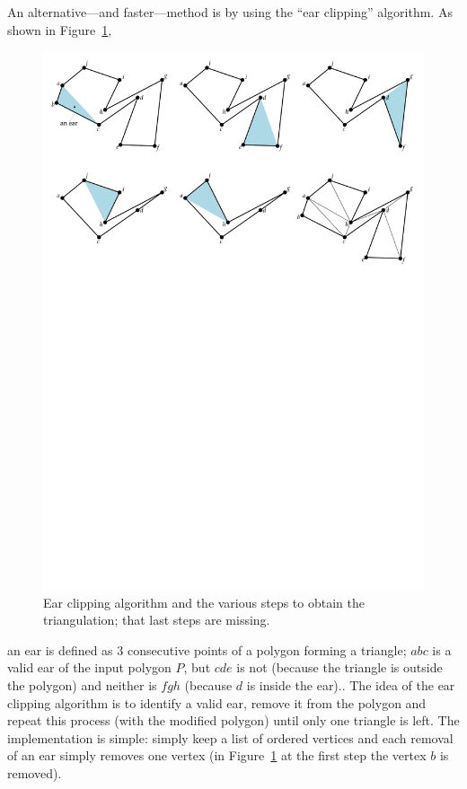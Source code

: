 An alternative---and faster---method is by using the ``ear clipping'' algorithm. 
As shown in Figure~\ref{fig:earclipping},
\begin{figure}
  \centering
  \includegraphics[width=\textwidth]{figs/earclipping}
  \caption{Ear clipping algorithm and the various steps to obtain the triangulation; that last steps are missing.}
\label{fig:earclipping}
\end{figure}
an ear is defined as 3 consecutive points of a polygon forming a triangle; $abc$ is a valid ear of the input polygon $P$, but $cde$ is not (because the triangle is outside the polygon) and neither is $fgh$ (because $d$ is inside the ear).. 
The idea of the ear clipping algorithm is to identify a valid ear, remove it from the polygon and repeat this process (with the modified polygon) until only one triangle is left. 
The implementation is simple: simply keep a list of ordered vertices and each removal of an ear simply removes one vertex (in Figure~\ref{fig:earclipping} at the first step the vertex $b$ is removed).

